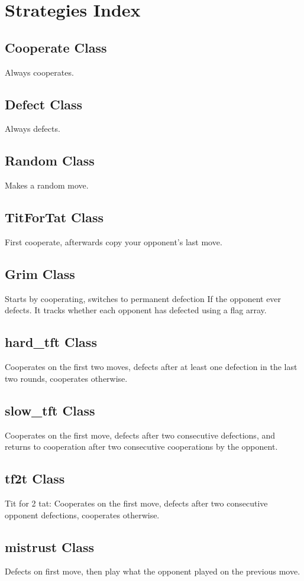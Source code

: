 \documentclass[12pt]{report}
\begin{document}
\section{Strategies Index}
\subsection{Cooperate Class}
Always cooperates.
\subsection{Defect Class}
Always defects.
\subsection{Random Class}
Makes a random move.
\subsection{TitForTat Class}
First cooperate, afterwards copy your opponent's last move.
\subsection{Grim Class}
Starts by cooperating, switches to permanent defection If the opponent ever defects. It tracks whether each opponent has defected using a flag array.
\subsection{hard\_tft Class}
Cooperates on the first two moves, defects after at least one defection in the last two rounds,
cooperates otherwise.
\subsection{slow\_tft Class}
Cooperates on the first  move, defects after two consecutive defections,
and returns to cooperation after two consecutive cooperations by the opponent.
\subsection{tf2t Class}
Tit for 2 tat: Cooperates on the first move, defects after two consecutive opponent defections,
cooperates otherwise.
\subsection{mistrust Class}
Defects on first move, then play what the opponent played on the previous move.
\end{document}
